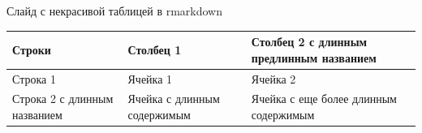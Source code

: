\documentclass[ignorenonframetext,]{beamer}
\newcommand{\columnsbegin}{\begin{columns}}
\begin{document}

\begin{frame}{Слайд с некрасивой таблицей в rmarkdown}

\begin{longtable}[]{@{}lll@{}}
\toprule
\begin{minipage}[b]{0.09\columnwidth}\raggedright\strut
Строки\strut
\end{minipage} & \begin{minipage}[b]{0.08\columnwidth}\raggedright\strut
Столбец 1\strut
\end{minipage} & \begin{minipage}[b]{0.08\columnwidth}\raggedright\strut
Столбец 2 с длинным предлинным названием\strut
\end{minipage}\tabularnewline
\midrule
\endhead
\begin{minipage}[t]{0.09\columnwidth}\raggedright\strut
Строка 1\strut
\end{minipage} & \begin{minipage}[t]{0.08\columnwidth}\raggedright\strut
Ячейка 1\strut
\end{minipage} & \begin{minipage}[t]{0.08\columnwidth}\raggedright\strut
Ячейка 2\strut
\end{minipage}\tabularnewline
\begin{minipage}[t]{0.09\columnwidth}\raggedright\strut
Строка 2 с длинным названием\strut
\end{minipage} & \begin{minipage}[t]{0.08\columnwidth}\raggedright\strut
Ячейка с длинным содержимым\strut
\end{minipage} & \begin{minipage}[t]{0.08\columnwidth}\raggedright\strut
Ячейка с еще более длинным содержимым\strut
\end{minipage}\tabularnewline
\bottomrule
\end{longtable}

\end{frame}
\end{document}
